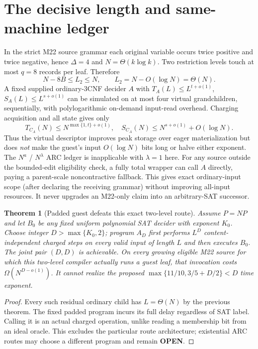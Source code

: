 \documentclass[11pt]{article}
\newtheorem{theorem}{Theorem}
\begin{document}
\section{The decisive length and same-machine ledger}
In the strict M22 source grammar each original variable occurs twice positive and twice negative, hence $\Delta=4$ and $N=\Theta(k\log k)$. Two restriction levels touch at most $q=8$ records per leaf. Therefore
\[
N-8B\le L_2\le N,\qquad L_2=N-O(\log N)=\Theta(N).
\]
A fixed supplied ordinary-3CNF decider $A$ with $T_A(L)\le L^{t+o(1)}$, $S_A(L)\le L^{s+o(1)}$ can be simulated on at most four virtual grandchildren, sequentially, with polylogarithmic on-demand input-read overhead. Charging acquisition and all state gives only
\[
T_{C_A}(N)\le N^{\max\{1,t\}+o(1)},\quad
S_{C_A}(N)\le N^{s+o(1)}+O(\log N).
\]
Thus the virtual descriptor improves peak storage over eager materialization but does \emph{not} make the guest's input $O(\log N)$ bits long or halve either exponent. The $N^a$ / $N^\lambda$ ARC ledger is inapplicable with $\lambda=1$ here. For any source outside the bounded-edit eligibility check, a fully total wrapper can call $A$ directly, paying a parent-scale noncontractive fallback. This gives exact ordinary-input scope (after declaring the receiving grammar) without improving all-input resources. It never upgrades an M22-only claim into an arbitrary-SAT successor.

\begin{theorem}[Padded guest defeats this exact two-level route]
Assume $P=NP$ and let $B_0$ be any fixed uniform polynomial SAT decider with exponent $K_0$. Choose integer $D>\max\{K_0,2\}$; program $A_D$ first performs $L^D$ content-independent charged steps on every valid input of length $L$ and then executes $B_0$. The joint pair $(D,D)$ is achievable. On every growing eligible M22 source for which this two-level compiler actually runs a guest leaf, that invocation costs $\Omega(N^{D-o(1)})$. It cannot realize the proposed $\max\{11/10,3/5+D/2\}<D$ time exponent.
\end{theorem}
\begin{proof}
Every such residual ordinary child has $L=\Theta(N)$ by the previous theorem. The fixed padded program incurs its full delay regardless of SAT label. Calling it is an actual charged operation, unlike reading a membership bit from an ideal oracle. This excludes the particular route architecture; existential ARC routes may choose a different program and remain \textbf{OPEN}.
\end{proof}
\end{document}
